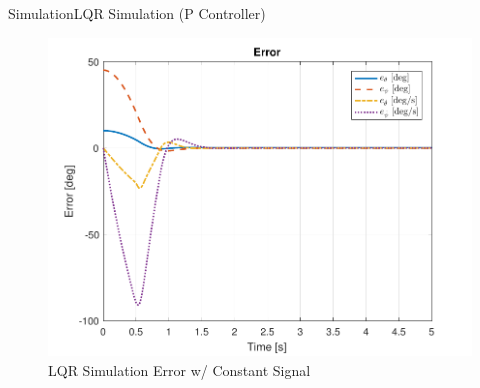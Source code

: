 \documentclass{beamer}
\begin{document}
\begin{frame}{Simulation}{LQR Simulation (P Controller)}
    \begin{figure}
      \centering 
      \includegraphics[scale=0.5]{figs/MATLAB/LQR/P_Simulation/LQR_Error_Con}
      \caption{LQR Simulation Error w/ Constant Signal}
      \label{fig:LQR_Error_Con}
    \end{figure}
\end{frame}
\end{document}
